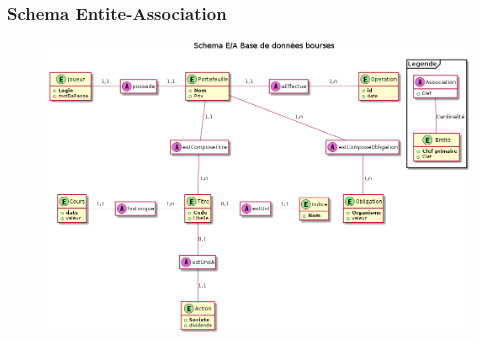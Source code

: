 \begin{frame}
    \frametitle{Schema Entite-Association}
    \begin{figure}
		\includegraphics[scale=0.23]{images/DiagrammeEntiteAssociation.png}
	\end{figure}

\end{frame}